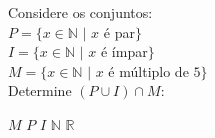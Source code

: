 Considere os conjuntos:\\
$P=\{x\in\mathbb{N}\,\,|\,\,x$ é par$\}$\\
$I=\{x\in\mathbb{N}\,\,|\,\,x$ é ímpar$\}$\\
$M=\{x\in\mathbb{N}\,\,|\,\,x$ é múltiplo de $5\}$\\
Determine $(P\cup I)\cap M$:

$M$
$P$
$I$
$\mathbb{N}$
$\mathbb{R}$





